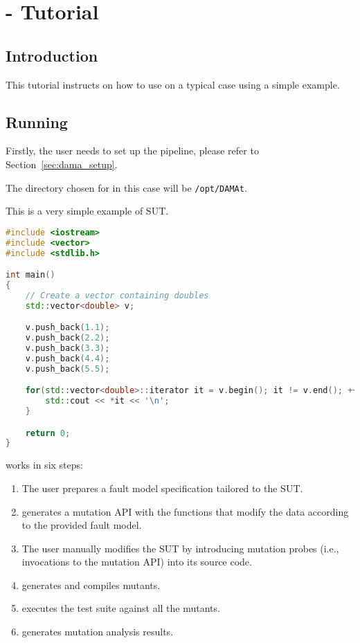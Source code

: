 
\chapter{\DAMA - Tutorial}
\label{chapter:dama:tutorial}

\STARTCHANGEDWPT

\section{Introduction}

This tutorial instructs on how to use \DAMA on a typical case using a simple example.

\section{Running \DAMA}
\label{sec:dama_single_machine}

Firstly, the user needs to set up the \DAMA pipeline, please refer to Section~\ref{sec:dama_setup}.

The directory chosen for \DAMA in this case will be \texttt{/opt/DAMAt}.

This is a very simple example of SUT.

\begin{lstlisting}[language=c++]
#include <iostream>
#include <vector>
#include <stdlib.h>

int main()
{
    // Create a vector containing doubles
    std::vector<double> v;

    v.push_back(1.1);
    v.push_back(2.2);
    v.push_back(3.3);
    v.push_back(4.4);
    v.push_back(5.5);

    for(std::vector<double>::iterator it = v.begin(); it != v.end(); ++it) {
    	std::cout << *it << '\n';
    }

    return 0;
}
\end{lstlisting}

\DAMA works in six steps:

\begin{enumerate}
	\item The user prepares a fault model specification tailored to the SUT.
	\item \DAMA generates a mutation API with the functions that modify the data according to the provided fault model.
	\item The user manually modifies the SUT by introducing mutation probes (i.e., invocations to the mutation API) into its source code.
	\item \DAMA generates and compiles mutants.
	\item \DAMA executes the test suite against all the mutants.
	\item \DAMA generates mutation analysis results.
\end{enumerate}


